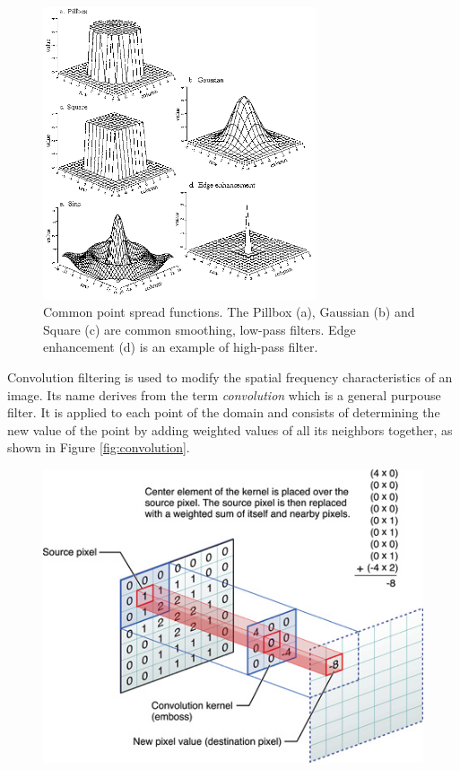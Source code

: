 { \begin{figure}
	\begin{center}
		\includegraphics[width=0.72\textwidth]{./images/opencal/kernel_functions}
		\caption{Common point spread functions. The Pillbox (a), Gaussian (b) and Square (c) are common smoothing, low-pass filters. Edge enhancement (d) is an example of high-pass filter. }
		\label{fig:kernel_functions}
	\end{center}
\end{figure}
Convolution filtering is used to modify the spatial frequency
characteristics of an image. Its name derives from the term \textit{convolution} which is a general purpouse filter. It is applied to each  point of the domain and consists of determining the new value of the point  by adding weighted values of all its neighbors together, as shown in Figure \ref{fig:convolution}.
 \begin{figure}
	\begin{center}
		\includegraphics[width=1.0\textwidth]{./images/opencal/kernel_convolution}

\end{center}
\end{figure}}
